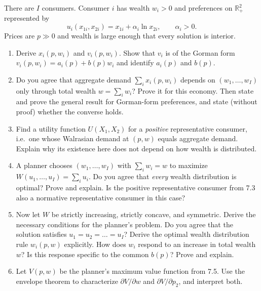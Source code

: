 \documentclass[11pt]{article}
\newcommand{\R}{\mathbb{R}}
\begin{document}
There are $I$ consumers. Consumer $i$ has wealth $w_i>0$ and preferences on $\R^2_+$ represented by
\[
u_i(x_{1i},x_{2i})=x_{1i}+\alpha_i\ln x_{2i},\qquad \alpha_i>0 .
\]
Prices are $p\gg0$ and wealth is large enough that every solution is interior.
\begin{enumerate}[label=\textbf{7.\arabic*}]
  \item Derive $x_i(p,w_i)$ and $v_i(p,w_i)$. Show that $v_i$ is of the Gorman form $v_i(p,w_i)=a_i(p)+b(p)w_i$ and identify $a_i(p)$ and $b(p)$.
  \item Do you agree that aggregate demand $\sum_i x_i(p,w_i)$ depends on $(w_1,\dots,w_I)$ only through total wealth $w=\sum_i w_i$? Prove it for this economy. Then state and prove the general result for Gorman-form preferences, and state (without proof) whether the converse holds.
  \item Find a utility function $U(X_1,X_2)$ for a \emph{positive} representative consumer, i.e.\ one whose Walrasian demand at $(p,w)$ equals aggregate demand. Explain why its existence here does not depend on how wealth is distributed.
  \item A planner chooses $(w_1,\dots,w_I)$ with $\sum_i w_i=w$ to maximize $W(u_1,\dots,u_I)=\sum_i u_i$. Do you agree that \emph{every} wealth distribution is optimal? Prove and explain. Is the positive representative consumer from 7.3 also a normative representative consumer in this case?
  \item Now let $W$ be strictly increasing, strictly concave, and symmetric. Derive the necessary conditions for the planner's problem. Do you agree that the solution satisfies $u_1=u_2=\dots=u_I$? Derive the optimal wealth distribution rule $w_i(p,w)$ explicitly. How does $w_i$ respond to an increase in total wealth $w$? Is this response specific to the common $b(p)$? Prove and explain.
  \item Let $V(p,w)$ be the planner's maximum value function from 7.5. Use the envelope theorem to characterize $\partial V/\partial w$ and $\partial V/\partial p_2$, and interpret both.
\end{enumerate}
\end{document}
